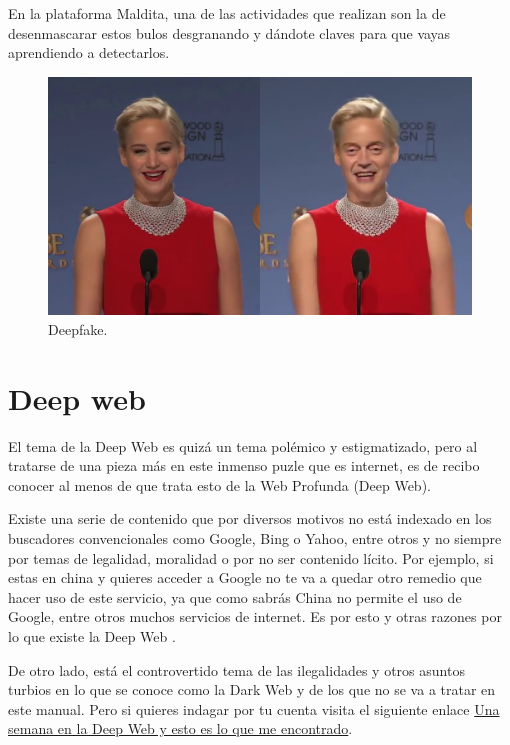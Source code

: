 \documentclass[
  a4paper,
  openany]{book}
\begin{document}
En la plataforma Maldita, una de las actividades que realizan son la de desenmascarar estos bulos desgranando y dándote claves para que vayas aprendiendo a detectarlos.

\begin{figure}

{\centering \includegraphics[width=0.75\linewidth]{images/deepfake} 

}

\caption{Deepfake.}\label{fig:unnamed-chunk-21}
\end{figure}

\hypertarget{deep-web}{%
\section{Deep web}\label{deep-web}}

El tema de la Deep Web es quizá un tema polémico y estigmatizado, pero al tratarse de una pieza más en este inmenso puzle que es internet, es de recibo conocer al menos de que trata esto de la Web Profunda (Deep Web).

Existe una serie de contenido que por diversos motivos no está indexado en los buscadores convencionales como Google, Bing o Yahoo, entre otros y no siempre por temas de legalidad, moralidad o por no ser contenido lícito. Por ejemplo, si estas en china y quieres acceder a Google no te va a quedar otro remedio que hacer uso de este servicio, ya que como sabrás China no permite el uso de Google, entre otros muchos servicios de internet. Es por esto y otras razones por lo que existe la Deep Web \citep{OSI-deep-web}.

De otro lado, está el controvertido tema de las ilegalidades y otros asuntos turbios en lo que se conoce como la Dark Web y de los que no se va a tratar en este manual. Pero si quieres indagar por tu cuenta visita el siguiente enlace \href{https://www.xataka.com/analisis/una-semana-en-la-deep-web-esto-es-lo-que-me-he-encontrado}{Una semana en la Deep Web y esto es lo que me encontrado}.
\end{document}
